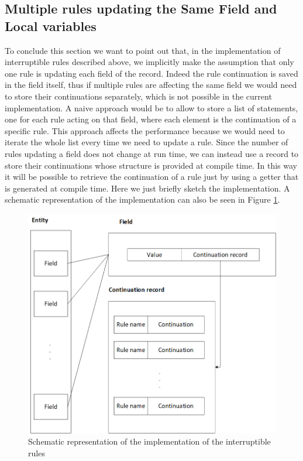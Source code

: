 \subsection{Multiple rules updating the Same Field and Local variables}
To conclude this section we want to point out that, in the implementation of interruptible rules described above, we implicitly make the assumption that only one rule is updating each field of the record. Indeed the rule continuation is saved in the field itself, thus if multiple rules are affecting the same field we would need to store their continuations separately, which is not possible in the current implementation. A naive approach would be to allow to store a list of statements, one for each rule acting on that field, where each element is the continuation of a specific rule. This approach affects the performance because we would need to iterate the whole list every time we need to update a rule. Since the number of rules updating a field does not change at run time, we can instead use a record to store their continuations whose structure is provided at compile time. In this way it will be possible to retrieve the continuation of a rule just by using a getter that is generated at compile time. Here we just briefly sketch the implementation. A schematic representation of the implementation can also be seen in Figure \ref{fig:ch_networking_interruptible_rules}.

\begin{figure}
  \centering
  \includegraphics[width=\textwidth]{Figures/chapter_networking/interruptible_rules}
  \caption{Schematic representation of the implementation of the interruptible rules}
  \label{fig:ch_networking_interruptible_rules}
\end{figure}

